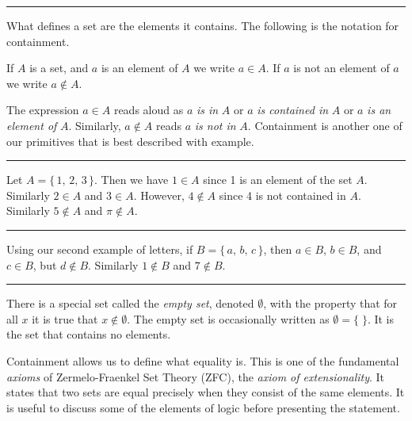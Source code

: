         \hrule\par\hfill\par
        What defines a set are the elements it contains. The following is the
        notation for containment.
        \begin{notation}
            If $A$ is a set, and $a$ is an element of $A$ we write
            $a\in{A}$. If $a$ is not an element of $a$ we write $a\notin{A}$.
        \end{notation}
        The expression $a\in{A}$ reads aloud as $a$ \textit{is in} $A$ or
        $a$ \textit{is contained in} $A$ or $a$ \textit{is an element of} $A$.
        Similarly, $a\notin{A}$ reads $a$ \textit{is not in} $A$. Containment is
        another one of our primitives that is best described with example.
        \par\hfill\par\hrule
        \begin{example}
            Let $A=\{\,1,\,2,\,3\,\}$. Then we have $1\in{A}$ since 1 is an
            element of the set $A$. Similarly $2\in{A}$ and $3\in{A}$. However,
            $4\notin{A}$ since 4 is not contained in $A$. Similarly
            $5\notin{A}$ and $\pi\notin{A}$.
        \end{example}
        \hrule
        \begin{example}
            Using our second example of letters, if $B=\{\,a,\,b,\,c\,\}$, then
            $a\in{B}$, $b\in{B}$, and $c\in{B}$, but $d\notin{B}$. Similarly
            $1\notin{B}$ and $7\notin{B}$.
        \end{example}
        \hrule\par\hfill\par
        There is a special set called the \textit{empty set}, denoted
        $\emptyset$, with the property that for all $x$ it is true that
        $x\notin\emptyset$. The empty set is occasionally written as
        $\emptyset=\{\;\}$. It is the set that contains no elements.
        \par\hfill\par
        Containment allows us to define what equality is. This is one of the
        fundamental \textit{axioms} of Zermelo-Fraenkel Set Theory (ZFC), the
        \textit{axiom of extensionality}. It states that two sets are equal
        precisely when they consist of the same elements. It is useful to
        discuss some of the elements of logic before presenting the statement.
